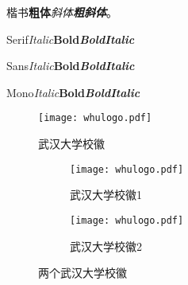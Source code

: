 {\kaishu 楷书\quad \textbf{粗体}\quad \textit{斜体}\quad \textbf{\textit{粗斜体}}}。

Serif\quad \textit{Italic}\quad \textbf{Bold}\quad \textbf{\textit{BoldItalic}}

{\sffamily Sans\quad \textit{Italic}\quad \textbf{Bold}\quad \textbf{\textit{BoldItalic}}}

{\ttfamily Mono\quad \textit{Italic}\quad \textbf{Bold}\quad \textbf{\textit{BoldItalic}}}


\begin{figure}[t]
  \centering
  \texttt{[image: whulogo.pdf]}
  \caption{武汉大学校徽}
  \label{fig:whu_logo}
\end{figure}
\begin{figure}[t]
  \centering
  \begin{subfigure}{0.2\textwidth}
    \texttt{[image: whulogo.pdf]}
    \caption{武汉大学校徽1}
    \label{fig:whu_logo2_1}
  \end{subfigure}
  \hspace{2cm}
  \begin{subfigure}{0.2\textwidth}
    \texttt{[image: whulogo.pdf]}
    \caption{武汉大学校徽2}
    \label{fig:whu_logo2_2}
  \end{subfigure}
  \caption{两个武汉大学校徽}
  \label{fig:whu_logo2}
\end{figure}
\begin{table}[t]
     \caption{两个表格}
     \hfill
     \label{tab:table1}
\end{table}
